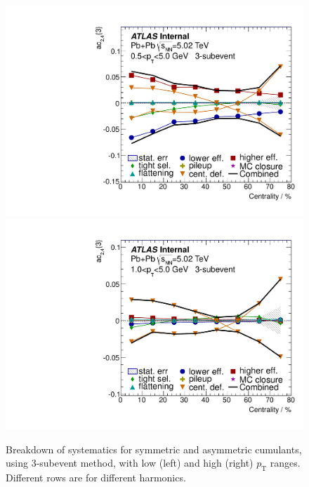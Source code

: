 \begin{figure}[H]
\includegraphics[width=.425\linewidth]{figs/sec_sys/summary/sys_ac_3sub_Har2_Pt0.pdf}
\includegraphics[width=.425\linewidth]{figs/sec_sys/summary/sys_ac_3sub_Har2_Pt1.pdf}
\caption{Breakdown of systematics for symmetric and asymmetric cumulants, using 3-subevent method, with low (left) and high (right) $p_\text{T}$ ranges. Different rows are for different harmonics.}
\label{fig:apdx_sys_sc_3sub}
\end{figure}

